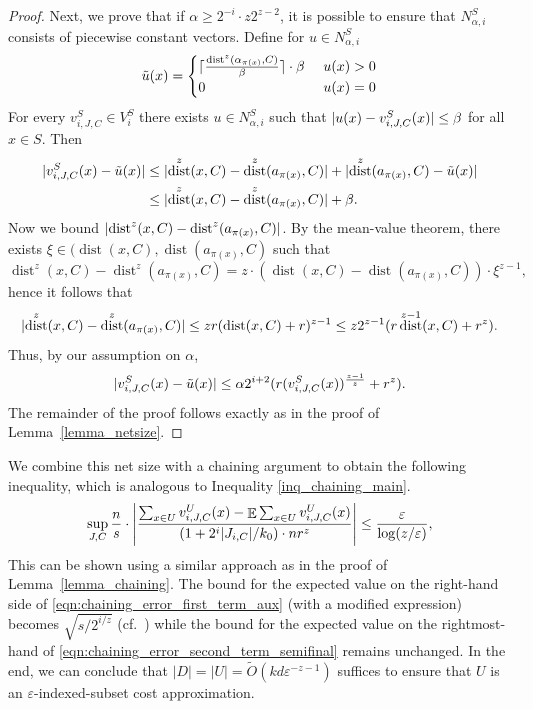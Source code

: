 \documentclass[11pt,letterpaper]{article}
\theoremstyle{definition}
\newcommand{\eps}{\varepsilon}
\DeclareMathOperator*{\E}{\ensuremath{\mathbb{E}}}
\DeclareMathOperator{\dist}{dist}
\DeclarePairedDelimiter{\abs}{\lvert}{\rvert}
\DeclarePairedDelimiter{\ceil}{\lceil}{\rceil}
\begin{document}
\begin{proof}
%
Next, we prove that if $\alpha\geq 2^{-i}\cdot z2^{z-2}$, it is possible to ensure that $N_{\alpha,i}^S$ consists of piecewise constant vectors. 
%
Define for $u\in N_{\alpha,i}^S$
\[
\tilde{u}(x)=
\begin{cases}
    \ceil{\frac{\dist^z(\alpha_{\pi(x)},C)}{\beta}}\cdot \beta \ &u(x)>0 \\
    0 \ &u(x)=0
\end{cases}
\]
For every $v_{i,J,C}^S\in V_i^S$ there exists $u\in N_{\alpha,i}^S$ such that $\abs{u(x)-v_{i,J,C}^S(x)}\leq \beta $ for all $x\in S$. Then 
\begin{align*}
    \abs{v_{i,J,C}^S(x) - \tilde{u}(x)} &\leq \abs{\dist^z(x,C) - \dist^z(a_{\pi(x)},C)} + \abs{\dist^z(a_{\pi(x)},C) - \tilde{u}(x)} \\
    &\leq \abs{\dist^z(x,C)-\dist^z(a_{\pi(x)},C)} + \beta.
\end{align*}
\sloppy
Now we bound $\abs{\dist^z(x,C) - \dist^z(a_{\pi(x)},C)}$. By the mean-value theorem, there exists $\xi\in (\dist(x,C), \dist(a_{\pi(x)},C)$ such that
\[
	\dist^z(x,C) - \dist^z(a_{\pi(x)},C) = z\cdot (\dist(x,C) - \dist(a_{\pi(x)},C)) \cdot \xi^{z-1},
\]
hence it follows that
\begin{equation}\label{eqn:dist^z_to_center_difference_kzC}
	\abs{\dist^z(x,C)-\dist^z(a_{\pi(x)},C)}
    \leq zr (\dist(x,C) + r)^{z-1}\\
    \leq z2^{z-1}(r\dist^{z-1}(x,C) + r^z).
\end{equation}
Thus, by our assumption on $\alpha$,
\[
	\abs{v_{i,J,C}^S(x) - \tilde{u}(x)} \leq \alpha 2^{i+2} (r (v_{i,J,C}^S(x))^{\frac{z-1}{z}} + r^z ).
\]
The remainder of the proof follows exactly as in the proof of Lemma~\ref{lemma_netsize}.
\end{proof}

We combine this net size with a chaining argument to obtain the following inequality, which is analogous to Inequality \eqref{inq_chaining_main}.  
%
\begin{equation*} 
\sup_{J,C} \frac{n}{s}\cdot \abs*{ \frac{\sum_{x\in U} v^U_{i,J,C}(x)-\E \sum_{x\in U} v^U_{i,J,C}(x)}{(1+2^i|J_{i,C}|/k_0)\cdot nr^z} }
\leq \frac{\eps}{\log(z/\eps)},
\end{equation*}
This can be shown using a similar approach as in the proof of Lemma~\ref{lemma_chaining}. 
The bound for the expected value on the right-hand side of \eqref{eqn:chaining_error_first_term_aux} (with a modified expression) becomes \( \sqrt{s/2^{i/z}} \) (cf.\ \cite[Section 4.2]{Cohen25}) while the bound for the expected value on the rightmost-hand of \eqref{eqn:chaining_error_second_term_semifinal} remains unchanged. 
%
In the end, 
we can conclude that $|D| = |U| = \tilde{O}( k d \eps^{-z-1})$ suffices to ensure that $U$ is an $\eps$-indexed-subset cost approximation.
\end{document}
